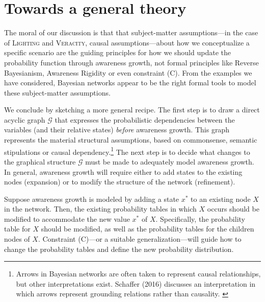 \documentclass[
  11pt,
  dvipsnames,enabledeprecatedfontcommands, todos]{scrartcl}
\begin{document}
\hypertarget{towards-a-general-theory}{%
\section{Towards a general theory}\label{towards-a-general-theory}}

\label{sec:general}

The moral of our discussion is that that subject-matter assumptions---in
the case of \textsc{Lighting} and \textsc{Veracity}, causal
assumptions---about how we conceptualize a specific scenario are the
guiding principles for how we should update the probability function
through awareness growth, not formal principles like Reverse
Bayesianism, Awareness Rigidity or even constraint (C). From the
examples we have considered, Bayesian networks appear to be the right
formal tools to model these subject-matter assumptions.

We conclude by sketching a more general recipe. The first step is to
draw a direct acyclic graph \(\mathcal{G}\) that expresses the
probabilistic dependencies between the variables (and their relative
states) \textit{before} awareness growth. This graph represents the
material structural assumptions, based on commonsense, semantic
stipulations or causal dependency.\footnote{Arrows in Bayesian networks
  are often taken to represent causal relationships, but other
  interpretations exist. Schaffer (2016) discusses an interpretation in
  which arrows represent grounding relations rather than causality.
  \label{footnote:causation}} The next step is to decide what changes to
the graphical structure \(\mathcal{G}\) must be made to adequately model
awareness growth. In general, awareness growth will require either to
add states to the existing nodes (expansion) or to modify the structure
of the network (refinement).

Suppose awareness growth is modeled by adding a state \(x^*\) to an
existing node \(X\) in the network. Then, the existing probability
tables in which \(X\) occurs should be modified to accommodate the new
value \(x^*\) of \(X\). Specifically, the probability table for \(X\)
should be modified, as well as the probability tables for the children
nodes of \(X\). Constraint (C)---or a suitable generalization---will
guide how to change the probability tables and define the new
probability distribution.
\end{document}
